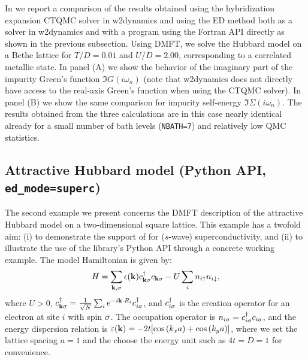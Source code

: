 \documentclass[edipack_sp.tex]{subfiles}
\begin{document}
In  we report a comparison of the results obtained using the hybridization expansion CTQMC solver in w2dynamics and using the \NAME ED method both as a solver in w2dynamics and with a program using the Fortran API directly as shown in the previous subsection. Using DMFT, we solve the Hubbard model on a Bethe lattice for $T/D=0.01$ and $U/D=2.00$, corresponding to a correlated metallic state. 
In panel (A) we show the behavior of the imaginary part of the impurity Green's function $\Im{G}(i\omega_n)$ (note that w2dynamics does not directly have access to the real-axis Green's function when using the CTQMC solver). In panel (B) we show the same comparison for impurity self-energy $\Im{\Sigma}(i\omega_n)$. 
The results obtained from the three calculations are in this case nearly identical already for a small number of bath levels ({\tt NBATH=7}) and relatively low QMC statistics.   



















\subsection{Attractive Hubbard model (Python API, {\tt ed\_mode=superc})}\label{SecExamplesAHM}
The second example we present concerns the DMFT description of the 
attractive Hubbard model on a two-dimensional square lattice. This 
example has a twofold aim: (i) to demonstrate the support of \NAME 
for ($s$-wave) superconductivity, and (ii) to illustrate the use of 
the library's Python API through a concrete working example. The 
model Hamiltonian is given by:
$$
H = \sum_{{\bf k},\sigma} \epsilon({\bf k}) c^\dagger_{{\bf k}\sigma} c_{{\bf k}\sigma} 
    - U \sum_i n_{i\uparrow} n_{i\downarrow},
$$
where $U > 0$, $c^\dagger_{{\bf k}\sigma} = \tfrac{1}{\sqrt{N}} 
\sum_i e^{-i{\bf k} \cdot R_i} c^\dagger_{i\sigma}$, and $c^\dagger_{i\sigma}$ 
is the creation operator for an electron at site $i$ with spin $\sigma$. 
The occupation operator is $n_{i\sigma} = c^\dagger_{i\sigma} c_{i\sigma}$, and 
the energy dispersion relation is $\varepsilon({\bf k})=-2t[\cos{(k_x a)}+
\cos{(k_y a)}]$, where we set the lattice spacing 
$a=1$  and the choose the energy unit such as $4t=D=1$ for convenience.
\end{document}
